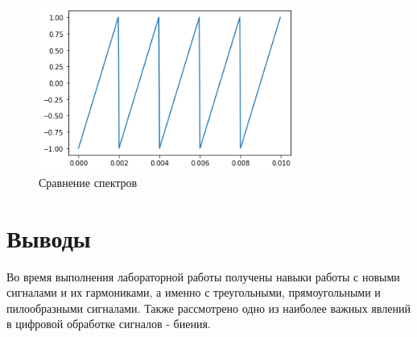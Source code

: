\documentclass[a4paper,12pt]{report}
\begin{document}
\begin{figure}[H]
        \centering
        \includegraphics[width=0.75\textwidth]{9.png}
        \caption{Сравнение спектров}
        \label{fig:fig6_3}
\end{figure}

\chapter{Выводы}

Во время выполнения лабораторной работы получены навыки работы с новыми сигналами и их гармониками, а именно с треугольными, прямоугольными и пилообразными сигналами. Также рассмотрено одно из наиболее важных явлений в цифровой обработке сигналов - биения.
\end{document}
